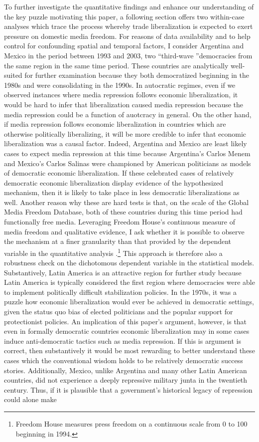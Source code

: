 \documentclass[12pt,a4paper]{article}
\begin{document}
To further investigate the quantitative findings and enhance our understanding of the key puzzle motivating this paper, a following section offers two within-case analyses which trace the process whereby trade liberalization is expected to exert pressure on domestic media freedom. For reasons of data availability and to help control for confounding spatial and temporal factors, I consider Argentina and Mexico in the period between 1993 and 2003, two ``third-wave ''democracies from the same region in the same time period. These countries are analytically well-suited for further examination because they both democratized beginning in the 1980s and were consolidating in the 1990s. In autocratic regimes, even if we observed instances where media repression follows economic liberalization, it would be hard to infer that liberalization caused media repression because the media repression could be a function of auotcracy in general. On the other hand, if media repression follows economic liberalization in countries which are otherwise politically liberalizing, it will be more credible to infer that economic liberalization was a causal factor. Indeed, Argentina and Mexico are least likely cases to expect media repression at this time because Argentina's Carlos Menem and Mexico's Carlos Salinas were championed by American politicians as models of democratic economic liberalization. If these celebrated cases of relatively democratic economic liberalization display evidence of the hypothesized mechanism, then it is likely to take place in less democratic liberalizations as well. Another reason why these are hard tests is that, on the scale of the Global Media Freedom Database, both of these countries during this time period had functionally free media. Leveraging Freedom House's continuous measure of media freedom and qualitative evidence, I ask whether it is possible to observe the mechanism at a finer granularity than that provided by the dependent variable in the quantitative analysis \parencite{FreedomHouse:2011vv}.\footnote{Freedom House measures press freedom on a continuous scale from 0 to 100 beginning in 1994.} This approach is therefore also a robustness check on the dichotomous dependent variable in the statistical models. Substantively, Latin America is an attractive region for further study because Latin America is typically considered the first region where democracies were able to implement politically difficult stabilization policies. In the 1970s, it was a puzzle how economic liberalization would ever be achieved in democratic settings, given the status quo bias of elected politicians and the popular support for protectionist policies. An implication of this paper's argument, however, is that even in formally democratic countries economic liberalization may in some cases induce anti-democratic tactics such as media repression. If this is argument is correct, then substantively it would be most rewarding to better understand these cases which the conventional wisdom holds to be relatively democratic success stories. Additionally, Mexico, unlike Argentina and many other Latin American countries, did not experience a deeply repressive military junta in the twentieth century. Thus, if it is plausible that a government's historical legacy of repression could alone make 
\end{document}
